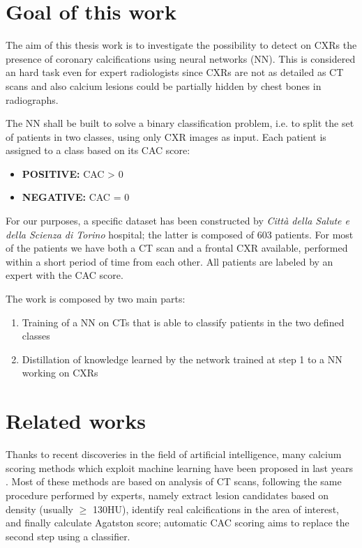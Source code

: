 \section{Goal of this work}\label{sec:goal_of_this_work}
The aim of this thesis work is to investigate the possibility to detect on CXRs the presence of coronary calcifications using neural networks (NN).
This is considered an hard task even for expert radiologists since CXRs are not as detailed as CT scans and also calcium lesions could be partially hidden by chest bones in radiographs.

The NN shall be built to solve a binary classification problem, i.e. to split the set of patients in two classes, using only CXR images as input.
Each patient is assigned to a class based on its CAC score:
\begin{itemize}
    \item \textbf{POSITIVE:} CAC > 0
    \item \textbf{NEGATIVE:} CAC = 0
\end{itemize}

For our purposes, a specific dataset has been constructed by \emph{Città della Salute e della Scienza di Torino} hospital; the latter is composed of 603 patients.
For most of the patients we have both a CT scan and a frontal CXR available, performed within a short period of time from each other.
All patients are labeled by an expert with the CAC score.

The work is composed by two main parts:
\begin{enumerate}
    \item Training of a NN on CTs that is able to classify patients in the two defined classes
    \item Distillation of knowledge learned by the network trained at step 1 to a NN working on CXRs
\end{enumerate}


\section{Related works}\label{sec:related_works}
Thanks to recent discoveries in the field of artificial intelligence, many calcium scoring methods which exploit machine learning have been proposed in last years \cite{vanvelzen2021ai}.
Most of these methods are based on analysis of CT scans, following the same procedure performed by experts, namely extract lesion candidates based on density (usually $\ge$ 130HU), identify real calcifications in the area of interest, and finally calculate Agatston score; automatic CAC scoring aims to replace the second step using a classifier.

